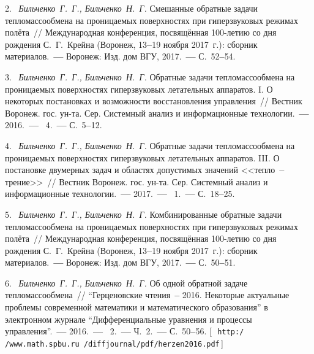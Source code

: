 2.~%
\textit{Бильченко~Г.~Г.,  Бильченко~Н.~Г.}\;
{%
  {Смешанные  обратные  задачи
   тепломассообмена  на  проницаемых
   поверхностях  при  гиперзвуковых
   режимах  полёта}~/$\!$/
   Международная  конференция,
   посвящённая  100-летию
   со  дня  рождения
   С.~Г.~Крейна
  (Воронеж,
  13{\textbf{--}}19  ноября  2017~г.):
  сборник  материалов.~{\textbf{---}}
  Воронеж:  Изд.  дом  ВГУ,
  2017.~{\textbf{---}}
  С.~52{\textbf{--}}54.
}

3.~%
\textit{Бильченко~Г.~Г.,  Бильченко~Н.~Г.}\;
{%
  {Обратные  задачи  тепломассообмена
    на  проницаемых  поверхностях
    гиперзвуковых  летательных  аппаратов.
    I.  О  некоторых  постановках
    и  возможности  восстановления  управления}~/$\!$/
  Вестник  Воронеж.  гос.  ун-та.
  Сер.  Системный  анализ
  и  информационные  технологии.~{\textbf{---}}
  2016.~{\textbf{---}}
  \No~4.~{\textbf{---}}
  С.~5{\textbf{--}}12.
  }

4.~%
\textit{Бильченко~Г.~Г.,  Бильченко~Н.~Г.}\;
{%
  {Обратные  задачи  тепломассообмена
    на  проницаемых  поверхностях
    гиперзвуковых  летательных  аппаратов.
    III.  О  постановке  двумерных  задач  и  областях
    допустимых  значений
    <<тепло~{\textbf{--}}  трение>>}~/$\!$/
  Вестник  Воронеж.  гос.  ун-та.
  Сер.  Системный  анализ
  и  информационные  технологии.~{\textbf{---}}
  2017.~{\textbf{---}}
  \No~1.~{\textbf{---}}
  С.~18{\textbf{--}}25.
  }

5.~%
\textit{Бильченко~Г.~Г.,  Бильченко~Н.~Г.}\;
{%
  {Комбинированные  обратные  задачи
   тепломассообмена  на  проницаемых
   поверхностях  при  гиперзвуковых
   режимах  полёта}~/$\!$/
  Международная  конференция,
  посвящённая  100-летию
  со  дня  рождения
  С.~Г.~Крейна
  (Воронеж,
  13{\textbf{--}}19  ноября  2017~г.):
  сборник  материалов.~{\textbf{---}}
  Воронеж:  Изд.  дом  ВГУ,
  2017.~{\textbf{---}}
  С.~50{\textbf{--}}51.
}

6.~%
\textit{Бильченко~Г.~Г.,  Бильченко~Н.~Г.}\;
{%
  {Об  одной  обратной  задаче  тепломассообмена}~/$\!$/
  ``Герценовские  чтения~{\textbf{--}} 2016.
  Некоторые  актуальные  проблемы
  современной  математики
  и  математического  образования''
  в  электронном  журнале
  ``Дифференциальные  уравнения
  и  процессы  управления''.~{\textbf{---}}
  2016.~{\textbf{---}}
  \No~2.~{\textbf{---}}
  Ч.~2.~{\textbf{---}}
  С.~50{\textbf{--}}56.
  [\,\texttt{%
       {http:}/$\!$/www.math.spbu.ru
       /diffjournal/pdf/herzen2016.pdf}\,]
  }

